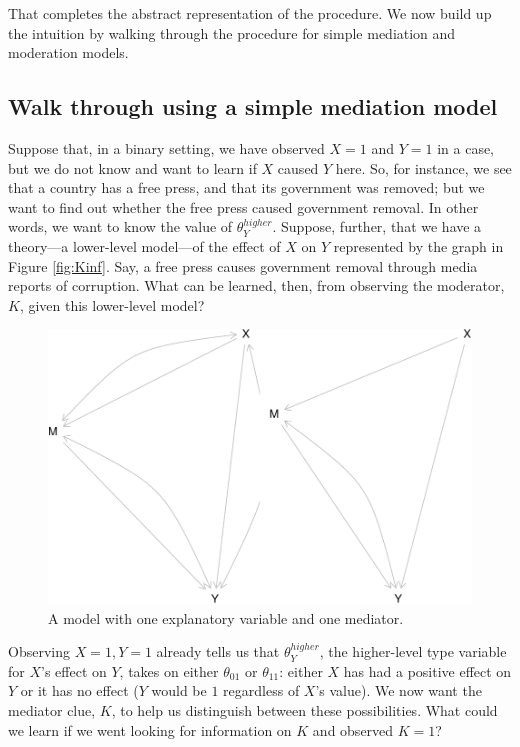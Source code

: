 \documentclass[12pt,]{book}
\begin{document}
That completes the abstract representation of the procedure. We now build up the intuition by walking through the procedure for simple mediation and moderation models.

\hypertarget{walk-through-using-a-simple-mediation-model}{%
\subsection{Walk through using a simple mediation model}\label{walk-through-using-a-simple-mediation-model}}

Suppose that, in a binary setting, we have observed \(X=1\) and \(Y=1\) in a case, but we do not know and want to learn if \(X\) caused \(Y\) here. So, for instance, we see that a country has a free press, and that its government was removed; but we want to find out whether the free press caused government removal. In other words, we want to know the value of \(\theta_Y^{higher}\). Suppose, further, that we have a theory---a lower-level model---of the effect of \(X\) on \(Y\) represented by the graph in Figure \ref{fig:Kinf}. Say, a free press causes government removal through media reports of corruption. What can be learned, then, from observing the moderator, \(K\), given this lower-level model?

\begin{figure}

{\centering \includegraphics[width=.7\textwidth]{ii_files/figure-latex/unnamed-chunk-34-1} 

}

\caption{\label{fig:Kinf} A model with one explanatory variable and one mediator.}\label{fig:unnamed-chunk-34}
\end{figure}

Observing \(X=1, Y=1\) already tells us that \(\theta_Y^{higher}\), the higher-level type variable for \(X\)'s effect on \(Y\), takes on either \(\theta_{01}\) or \(\theta_{11}\): either \(X\) has had a positive effect on \(Y\) or it has no effect (\(Y\) would be \(1\) regardless of \(X\)'s value). We now want the mediator clue, \(K\), to help us distinguish between these possibilities. What could we learn if we went looking for information on \(K\) and observed \(K=1\)?
\end{document}
